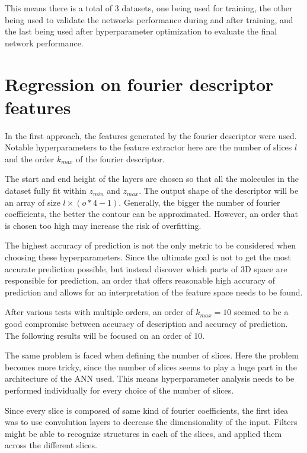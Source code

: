 This means there is a total of 3 datasets, one being used for training, the other being used to validate the networks
performance during and after training, and the last being used after hyperparameter optimization to evaluate the final network
performance.

\section{Regression on fourier descriptor features}
\label{sec:Evaluation:fourier}

In the first approach, the features generated by the fourier descriptor were used.
Notable hyperparameters to the feature extractor here are the number of slices $l$ and the order $k_{max}$ of the fourier descriptor.

The start and end height of the layers are chosen so that all the molecules in the dataset fully fit within $z_{min}$ and $z_{max}$.
The output shape of the descriptor will be an array of size $l \times (o * 4 - 1)$.
Generally, the bigger the number of fourier coefficients, the better the contour can be approximated.
However, an order that is chosen too high may increase the risk of overfitting.

The highest accuracy of prediction is not the only metric to be considered when choosing these hyperparameters.
Since the ultimate goal is not to get the most accurate prediction possible, but instead discover which parts of 3D space 
are responsible for prediction, an order that offers reasonable high accuracy of prediction and 
allows for an interpretation of the feature space needs to be found.

After various tests with multiple orders, an order of $k_{max} = 10$ seemed to be a good compromise between accuracy of description and accuracy of prediction.
The following results will be focused on an order of $10$.

The same problem is faced when defining the number of slices.
Here the problem becomes more tricky, since the number of slices seems to play a huge part in the architecture of the ANN used.
This means hyperparameter analysis needs to be performed individually for every choice of the number of slices.

Since every slice is composed of same kind of fourier coefficients, the first idea was to use convolution layers to decrease the dimensionality of the input.
Filters might be able to recognize structures in each of the slices, and applied them across the different slices.

